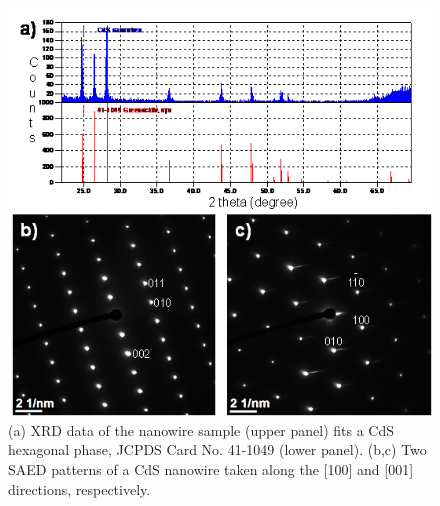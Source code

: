 \begin{figure}  
\includegraphics[width=\textwidth]{figures/figure6_s1}
\caption[CdS crystallography]
{(a) XRD data of the nanowire sample (upper panel) fits a CdS hexagonal phase, JCPDS Card No. 41-1049 (lower panel). (b,c) Two SAED patterns of a CdS nanowire taken along the [100] and [001] directions, respectively. 
\label{fig:6_s1}}
\end{figure}

